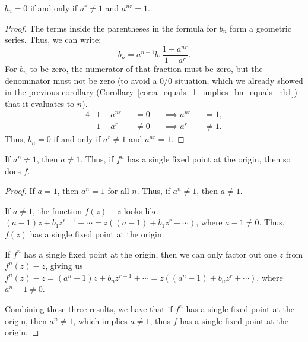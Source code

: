 \begin{corollary}[$b_n = 0 \iff a^r \neq 1$ and $a^{nr} = 1$]
    $b_n = 0$ if and only if $a^r \neq 1$ and $a^{nr} = 1$.
\end{corollary}
\begin{proof}
    The terms inside the parentheses in the formula for $b_n$ form a geometric
    series. Thus, we can write:
    \begin{equation*}
        b_n = a^{n-1} b_1 \frac{1 - a^{nr}}{1 - a^r}.
    \end{equation*}
    For $b_n$ to be zero, the numerator of that fraction must be zero, but the
    denominator must not be zero (to avoid a $0/0$ situation, which we already
    showed in the previous corollary
    (Corollary~\ref{cor:a_equals_1_implies_bn_equals_nb1}) that it evaluates to
    $n$).
    \begin{alignat*}{4}
        &1 - a^{nr} &&= 0    &&\implies a^{nr} &&= 1, \\
        &1 - a^r    &&\neq 0 &&\implies a^r    &&\neq 1.
    \end{alignat*}
    Thus, $b_n = 0$ if and only if $a^r \neq 1$ and $a^{nr} = 1$.
\end{proof}

\begin{remark}
    If $a^n \neq 1$, then $a \neq 1$. Thus, if $f^n$ has a single fixed point at
    the origin, then so does $f$.
\end{remark}
\begin{proof}
    If $a = 1$, then $a^n = 1$ for all $n$. Thus, if $a^n \neq 1$, then $a \neq
    1$.

    If $a \neq 1$, the function $f(z) - z$ looks like $(a-1)z + b_1 z^{r+1} +
    \cdots = z((a-1) + b_1 z^r + \cdots)$, where $a-1 \neq 0$. Thus, $f(z)$ has
    a single fixed point at the origin.

    If $f^n$ has a single fixed point at the origin, then we can only factor out
    one $z$ from $f^n(z) - z$, giving us $f^n(z) - z = (a^n - 1)z + b_n z^{r+1}
    + \cdots = z((a^n - 1) + b_n z^r + \cdots)$, where $a^n - 1 \neq 0$.

    Combining these three results, we have that if $f^n$ has a single fixed
    point at the origin, then $a^n \neq 1$, which implies $a \neq 1$, thus $f$
    has a single fixed point at the origin.
\end{proof}

